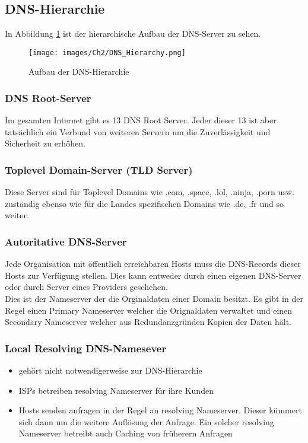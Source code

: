 \subsection{DNS-Hierarchie}
In Abbildung \ref{Ch02-DNS_Hierarchy} ist der hierarchische Aufbau der DNS-Server zu sehen.
\begin{figure}[H]
    \centering
    \texttt{[image: images/Ch2/DNS\_Hierarchy.png]}
    \caption{Aufbau der DNS-Hierarchie}
    \label{Ch02-DNS_Hierarchy}
\end{figure}

\subsubsection{DNS Root-Server}
Im gesamten Internet gibt es 13 DNS Root Server. Jeder dieser 13 ist aber tatsächlich ein Verbund von weiteren Servern um die Zuverlässigkeit und Sicherheit zu erhöhen.

\subsubsection{Toplevel Domain-Server (TLD Server)}
Diese Server sind für Toplevel Domains wie .com, .space, .lol, .ninja, .porn usw. zuständig ebenso wie für die Landes spezifischen Domains wie .de, .fr und so weiter.

\subsubsection{Autoritative DNS-Server}
Jede Organisation mit öffentlich erreichbaren Hosts muss die DNS-Records dieser Hosts zur Verfügung stellen. Dies kann entweder durch einen eigenen DNS-Server oder durch Server eines Providers geschehen.\\
\noindent Dies ist der Nameserver der die Orginaldaten einer Domain besitzt. Es gibt in der Regel einen Primary Nameserver welcher die Orignaldaten verwaltet und einen Secondary Nameserver welcher aus Redundanzgründen Kopien der Daten hält.

\subsubsection{Local Resolving DNS-Namesever}
\begin{itemize}
    \item gehört nicht notwendigerweise zur DNS-Hierarchie
    \item ISPs betreiben resolving Nameserver für ihre Kunden
    \item Hosts senden anfragen in der Regel an resolving Nameserver. Dieser kümmert sich dann um die weitere Auflösung der Anfrage. Ein solcher resolving Nameserver betreibt auch Caching von früherern Anfragen
\end{itemize}

